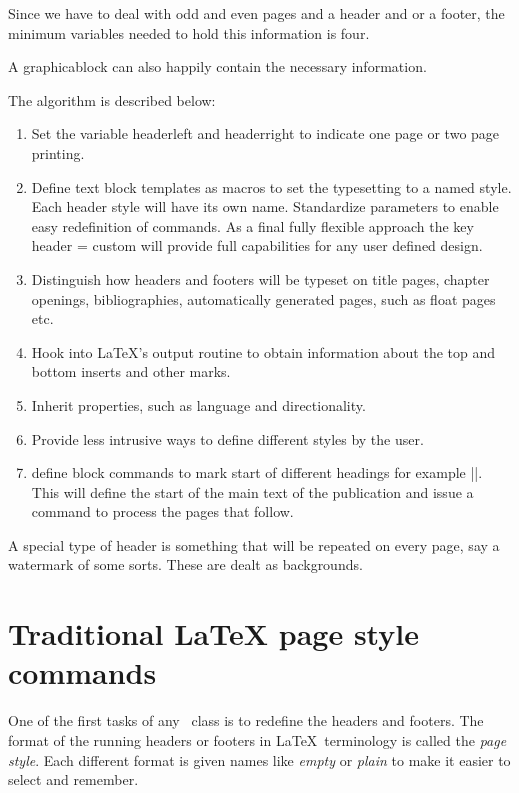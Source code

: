 Since we have to deal with odd and even pages and a header and or a footer, the minimum variables needed to hold this information is four. 

A graphicablock can also happily contain the necessary information.

The algorithm is described below:

\begin{enumerate}
\item Set the variable headerleft and headerright to indicate one page or two page printing.
\item Define text block templates as macros to set the typesetting to a named style. Each header style
         will have its own name. Standardize parameters to enable easy redefinition of commands. As a 
         final fully flexible approach the key header = custom will provide full capabilities for any user
         defined design.
\item Distinguish how headers and footers will be typeset on title pages, chapter openings, bibliographies, 
         automatically generated pages, such as float pages etc.
\item Hook into LaTeX’s output routine to obtain information about the top and bottom inserts and other marks.         
\item Inherit properties, such as language and directionality.
\item Provide less intrusive ways to define different styles by the user.
\item define block commands to mark start of different headings for example |\mainmatter|. This will define
         the start of the main text of the publication and issue a command to process the pages that follow.
\end{enumerate}

A special type of header is something that will be repeated on every page, say a watermark of some sorts. These are dealt as backgrounds.
 
\section{Traditional LaTeX page style commands}
  
One of the first tasks of any \LaTeXe\ class is to redefine the headers and footers. The format of the running headers or footers in \LaTeX\ terminology is called the \textit{page style}. Each different format is given names like \textit{empty} or \textit{plain} to make it easier to select and remember. 

